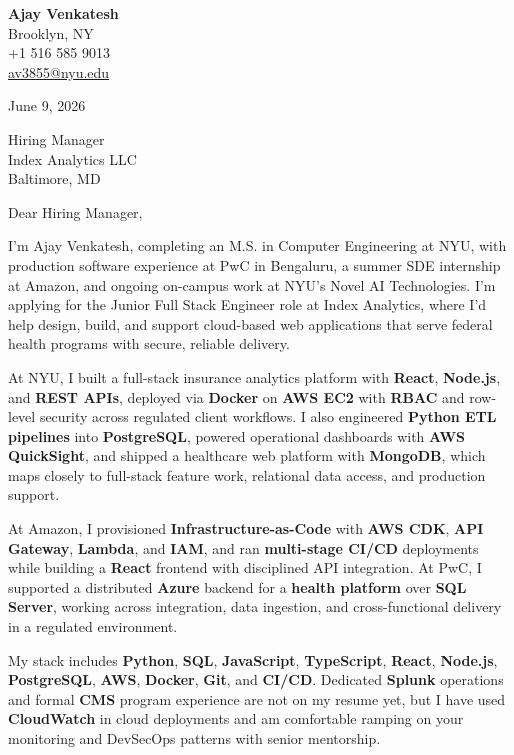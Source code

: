 \documentclass[letterpaper,11pt]{article}
\begin{document}
\begin{flushleft}
\textbf{\large Ajay Venkatesh} \\
Brooklyn, NY \\
+1 516 585 9013 \\
\href{mailto:av3855@nyu.edu}{av3855@nyu.edu}
\end{flushleft}
\vspace{10pt}
June 9, 2026
\vspace{6pt}

Hiring Manager \\
Index Analytics LLC \\
Baltimore, MD

\vspace{10pt}

Dear Hiring Manager,

I'm Ajay Venkatesh, completing an M.S. in Computer Engineering at NYU, with production software experience at PwC in Bengaluru, a summer SDE internship at Amazon, and ongoing on-campus work at NYU's Novel AI Technologies. I'm applying for the Junior Full Stack Engineer role at Index Analytics, where I'd help design, build, and support cloud-based web applications that serve federal health programs with secure, reliable delivery.

At NYU, I built a full-stack insurance analytics platform with \textbf{React}, \textbf{Node.js}, and \textbf{REST APIs}, deployed via \textbf{Docker} on \textbf{AWS EC2} with \textbf{RBAC} and row-level security across regulated client workflows. I also engineered \textbf{Python ETL pipelines} into \textbf{PostgreSQL}, powered operational dashboards with \textbf{AWS QuickSight}, and shipped a healthcare web platform with \textbf{MongoDB}, which maps closely to full-stack feature work, relational data access, and production support.

At Amazon, I provisioned \textbf{Infrastructure-as-Code} with \textbf{AWS CDK}, \textbf{API Gateway}, \textbf{Lambda}, and \textbf{IAM}, and ran \textbf{multi-stage CI/CD} deployments while building a \textbf{React} frontend with disciplined API integration. At PwC, I supported a distributed \textbf{Azure} backend for a \textbf{health platform} over \textbf{SQL Server}, working across integration, data ingestion, and cross-functional delivery in a regulated environment.

My stack includes \textbf{Python}, \textbf{SQL}, \textbf{JavaScript}, \textbf{TypeScript}, \textbf{React}, \textbf{Node.js}, \textbf{PostgreSQL}, \textbf{AWS}, \textbf{Docker}, \textbf{Git}, and \textbf{CI/CD}. Dedicated \textbf{Splunk} operations and formal \textbf{CMS} program experience are not on my resume yet, but I have used \textbf{CloudWatch} in cloud deployments and am comfortable ramping on your monitoring and DevSecOps patterns with senior mentorship.
\end{document}
